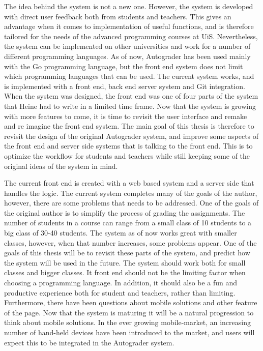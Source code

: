 The idea behind the system is not a new one. However, the system is developed with direct user feedback both from students and teachers. This gives an advantage when it comes to implementation of useful functions, and is therefore tailored for the needs of the advanced programming courses at UiS. Nevertheless, the system can be implemented on other universities and work for a number of different programming languages. As of now, Autograder has been used mainly with the Go programming language, but the front end system does not limit which programming languages that can be used. The current system works, and is implemented with a front end, back end server system and Git integration. When the system was designed, the front end was one of four parts of the system that Heine had to write in a limited time frame. Now that the system is growing with more features to come, it is time to revisit the user interface and remake and re imagine the front end system. The main goal of this thesis is therefore to revisit the design of the original Autograder system, and improve some aspects of the front end and server side systems that is talking to the front end. This is to optimize the workflow for students and teachers while still keeping some of the original ideas of the system in mind.

The current front end is created with a web based system and a server side that handles the logic. The current system completes many of the goals of the author, however, there are some problems that needs to be addressed. One of the goals of the original author is to simplify the process of grading the assignments. The number of students in a course can range from a small class of 10 students to a big class of 30-40 students. The system as of now works great with smaller classes, however, when that number increases, some problems appear. One of the goals of this thesis will be to revisit these parts of the system, and predict how the system will be used in the future. The system should work both for small classes and bigger classes. It front end should not be the limiting factor when choosing a programming language. In addition, it should also be a fun and productive experience both for student and teachers, rather than limiting. Furthermore, there have been questions about mobile solutions and other feature of the page. Now that the system is maturing it will be a natural progression to think about mobile solutions. In the ever growing mobile-market, an increasing number of hand-held devices have been introduced to the market, and users will expect this to be integrated in the Autograder system.


